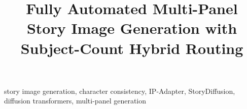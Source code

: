 \documentclass[conference]{IEEEtran}
\begin{document}
\title{Fully Automated Multi-Panel Story Image Generation with Subject-Count Hybrid Routing}

\author{
\and
{}
}

\maketitle

\begin{IEEEkeywords}
story image generation, character consistency, IP-Adapter, StoryDiffusion, diffusion transformers, multi-panel generation
\end{IEEEkeywords}

\begin{abstract}

\end{abstract}













\end{document}
